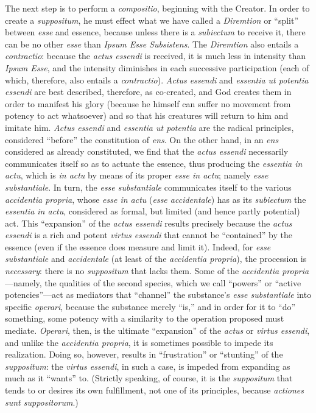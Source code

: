 The next step is to perform a \emph{compositio}, beginning with the Creator. In order to create a \emph{suppositum}, he must effect what we have called a \emph{Diremtion} or ``split'' between \emph{esse} and essence, because unless there is a \emph{subiectum} to receive it, there can be no other \emph{esse} than \emph{Ipsum Esse Subsistens}. The \emph{Diremtion} also entails a \emph{contractio}: because the \emph{actus essendi} is received, it is much less in intensity than \emph{Ipsum Esse}, and the intensity diminishes in each successive participation (each of which, therefore, also entails a \emph{contractio}). \emph{Actus essendi} and \emph{essentia ut potentia essendi} are best described, therefore, as co-created, and God creates them in order to manifest his glory (because he himself can suffer no movement from potency to act whatsoever) and so that his creatures will return to him and imitate him. \emph{Actus essendi} and \emph{essentia ut potentia} are the radical principles, considered ``before'' the constitution of \emph{ens}. On the other hand, in an \emph{ens} considered as already constituted, we find that the \emph{actus essendi} necessarily communicates itself so as to actuate the essence, thus producing the \emph{essentia in actu}, which is \emph{in actu} by means of its proper \emph{esse in actu}; namely \emph{esse substantiale}. In turn, the \emph{esse substantiale} communicates itself to the various \emph{accidentia propria}, whose \emph{esse in actu} (\emph{esse accidentale}) has as its \emph{subiectum} the \emph{essentia in actu}, considered as formal, but limited (and hence partly potential) act.  This ``expansion'' of the \emph{actus essendi} results precisely because the \emph{actus essendi} is a rich and potent \emph{virtus essendi} that cannot be ``contained'' by the essence (even if the essence does measure and limit it). Indeed, for \emph{esse substantiale} and \emph{accidentale} (at least of the \emph{accidentia propria}), the procession is \emph{necessary}: there is no \emph{suppositum} that lacks them. Some of the \emph{accidentia propria}---namely, the qualities of the second species, which we call ``powers'' or ``active potencies''---act as mediators that ``channel'' the substance's \emph{esse substantiale} into specific \emph{operari}, because the substance merely ``is,'' and in order for it to ``do'' something, some potency with a similarity to the operation proposed must mediate. \emph{Operari}, then, is the ultimate ``expansion'' of the \emph{actus} or \emph{virtus essendi}, and unlike the \emph{accidentia propria}, it is sometimes possible to impede its realization. Doing so, however, results in ``frustration'' or ``stunting'' of the \emph{suppositum}: the \emph{virtus essendi}, in such a case, is impeded from expanding as much as it ``wants'' to. (Strictly speaking, of course, it is the \emph{suppositum} that tends to or desires its own fulfillment, not one of its principles, because \emph{actiones sunt suppositorum}.)

